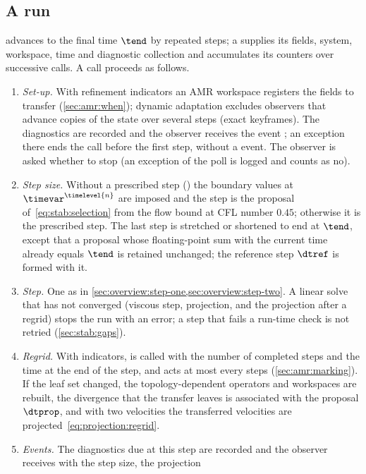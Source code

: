 \subsection{A run}\label{sec:overview:run}
 advances to the final time $\tend$ by repeated steps; a
 supplies its fields, system, workspace, time and
diagnostic collection and accumulates its counters over successive calls. A
call proceeds as follows.
\begin{enumerate}
\item \emph{Set-up.} With refinement indicators an AMR workspace registers
  the fields to transfer (\cref{sec:amr:when}); dynamic adaptation excludes
  observers that advance copies of the state over several steps (exact
  keyframes). The diagnostics are recorded and the observer receives the
  event ; an exception there ends the call before the first
  step, without a  event. The observer is asked whether to stop
  (an exception of the poll is logged and counts as no).
\item \emph{Step size.} Without a prescribed step () the
  boundary values at $\timevar^{\timelevel{n}}$ are imposed and the step is
  the proposal of~\cref{eq:stab:selection} from the flow bound at CFL number
  $0.45$; otherwise it is the prescribed step. The last step is stretched or
  shortened to end at $\tend$, except that a proposal whose floating-point
  sum with the current time already equals $\tend$ is retained unchanged;
  the reference step $\dtref$ is formed with it.
\item \emph{Step.} One  as in
  \cref{sec:overview:step-one,sec:overview:step-two}. A linear solve that has
  not converged (viscous step, projection, and the projection after a
  regrid) stops the run with an error; a step that fails a run-time check is
  not retried (\cref{sec:stab:gaps}).
\item \emph{Regrid.} With indicators,  is called with the
  number of completed steps and the time at the end of the step, and acts at
  most every  steps (\cref{sec:amr:marking}). If the
  leaf set changed, the topology-dependent operators and workspaces are
  rebuilt, the divergence that the transfer leaves is associated with the
  proposal $\dtprop$, and with two velocities the transferred velocities are
  projected~\cref{eq:projection:regrid}.
\item \emph{Events.} The diagnostics due at this step are recorded and the
  observer receives  with the step size, the projection

\end{enumerate}
